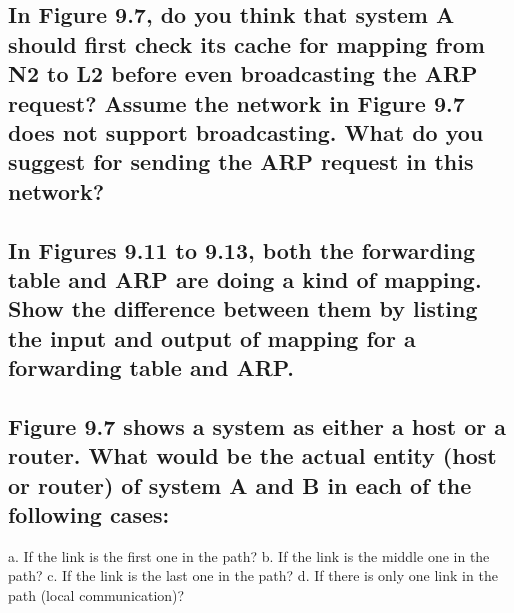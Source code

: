 \documentclass{article}
\begin{document}
\subsection{
	In Figure 9.7, do you think that system A should first check its cache for mapping from N2 to L2 before even broadcasting the ARP request?
	Assume the network in Figure 9.7 does not support broadcasting. What do you
	suggest for sending the ARP request in this network?
}
\subsection{
	In Figures 9.11 to 9.13, both the forwarding table and ARP are doing a kind of
	mapping. Show the difference between them by listing the input and output of
	mapping for a forwarding table and ARP.
}
\subsection{
	Figure 9.7 shows a system as either a host or a router. What would be the
	actual entity (host or router) of system A and B in each of the following cases:
}
a. If the link is the first one in the path?
b. If the link is the middle one in the path?
c. If the link is the last one in the path?
d. If there is only one link in the path (local communication)?
\end{document}
